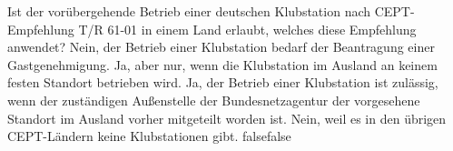     {Ist der vorübergehende Betrieb einer deutschen Klubstation nach CEPT-Empfehlung T/R  61-01 in einem Land erlaubt, welches diese Empfehlung anwendet?}
    {Nein, der Betrieb einer Klubstation bedarf der Beantragung einer Gastgenehmigung.}
    {Ja, aber nur, wenn die Klubstation im Ausland an keinem festen Standort betrieben wird.}
    {Ja, der Betrieb einer Klubstation ist zulässig, wenn der zuständigen Außenstelle der Bundesnetzagentur der vorgesehene Standort im Ausland vorher mitgeteilt worden ist.}
    {Nein, weil es in den übrigen CEPT-Ländern keine Klubstationen gibt.}
    {false}{false}